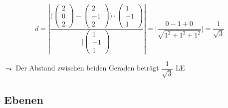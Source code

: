 \documentclass[a4paper, 15pt]{article}
\begin{document}
\vspace{0.3cm}
\begin{equation*}
d = \left|\dfrac{\Biggl(\left(\begin{array}{c} 2 \\ 0 \\ 2 \end{array}\right)-\left(\begin{array}{c} 2 \\ -1 \\ 2 \end{array}\right)\Biggl)\cdot \left(\begin{array}{c} 1 \\ -1 \\ 1 \end{array}\right)}{\Biggl|\left(\begin{array}{c} 1 \\ -1 \\ 1 \end{array}\right)\Biggl|}\right| = \Biggl|\dfrac{0-1+0}{\sqrt{1^2+1^2+1^2}}\Biggl| = \dfrac{1}{\sqrt{3}}
\end{equation*}
\begin{center}
$\leadsto$ Der Abstand zwischen beiden Geraden beträgt $\dfrac{1}{\sqrt{3}}$ LE
\end{center}
\subsection{Ebenen}
\end{document}
